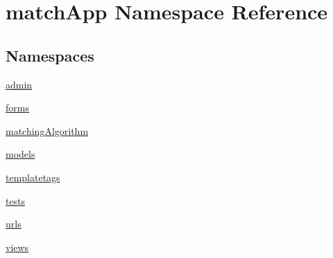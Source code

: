 \hypertarget{namespacematch_app}{}\section{match\+App Namespace Reference}
\label{namespacematch_app}
\subsection*{Namespaces}
\begin{DoxyCompactItemize}
\item 
 \hyperlink{namespacematch_app_1_1admin}{admin}
\item 
 \hyperlink{namespacematch_app_1_1forms}{forms}
\item 
 \hyperlink{namespacematch_app_1_1matching_algorithm}{matching\+Algorithm}
\item 
 \hyperlink{namespacematch_app_1_1models}{models}
\item 
 \hyperlink{namespacematch_app_1_1templatetags}{templatetags}
\item 
 \hyperlink{namespacematch_app_1_1tests}{tests}
\item 
 \hyperlink{namespacematch_app_1_1urls}{urls}
\item 
 \hyperlink{namespacematch_app_1_1views}{views}
\end{DoxyCompactItemize}
